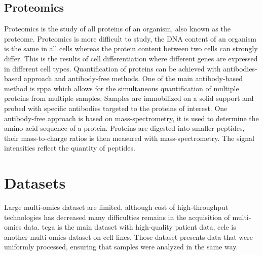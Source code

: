 \documentclass[../main.tex]{subfiles}
\begin{document}
 \subsection{Proteomics}\label{subsec:proteomics}
	 Proteomics is the study of all proteins of an organism, also known as the proteome.
	 Proteomics is more difficult to study, the DNA content of an organism is the same in all cells whereas the protein content between two cells can strongly differ.
	 This is the results of cell differentiation where different genes are expressed in different cell types.
	 Quantification of proteins can be achieved with antibodies-based approach and antibody-free methods.
	 One of the main antibody-based method is \gls{rppa} which allows for the simultaneous quantification of multiple proteins from multiple samples.
	 Samples are immobilized on a solid support and probed with specific antibodies targeted to the proteins of interest.
	 One antibody-free approach is based on mass-spectrometry, it is used to determine the amino acid sequence of a protein.
	 Proteins are digested into smaller peptides, their mass-to-charge ratios is then measured with mass-spectrometry.
	 The signal intensities reflect the quantity of peptides.

\section{Datasets}
 Large multi-omics dataset are limited, although cost of high-throughput technologies has decreased many difficulties remains in the acquisition of multi-omics data.
 \Gls{tcga} is the main dataset with high-quality patient data, \gls{ccle} is another multi-omics dataset on cell-lines.
 Those dataset presents data that were uniformly processed, ensuring that samples were analyzed in the same way.
\end{document}
